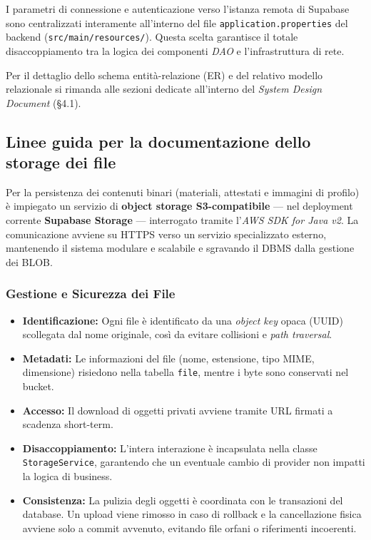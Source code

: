 I parametri di connessione e autenticazione verso l'istanza remota di Supabase sono centralizzati interamente all'interno del file \texttt{application.properties} del backend (\texttt{src/main/resources/}). Questa scelta garantisce il totale disaccoppiamento tra la logica dei componenti \textit{DAO} e l'infrastruttura di rete.

Per il dettaglio dello schema entit\`a-relazione (ER) e del relativo modello relazionale si rimanda alle sezioni dedicate all'interno del \textit{System Design Document} (§4.1).

\subsection{Linee guida per la documentazione dello storage dei file}
Per la persistenza dei contenuti binari (materiali, attestati e immagini di profilo) è impiegato un servizio di \textbf{object storage S3-compatibile} — nel deployment corrente \textbf{Supabase Storage} — interrogato tramite l'\textit{AWS SDK for Java v2}. La comunicazione avviene su HTTPS verso un servizio specializzato esterno, mantenendo il sistema modulare e scalabile e sgravando il DBMS dalla gestione dei BLOB.

\subsubsection{Gestione e Sicurezza dei File}
\begin{itemize}
    \item \textbf{Identificazione:} Ogni file è identificato da una \textit{object key} opaca (UUID) scollegata dal nome originale, così da evitare collisioni e \textit{path traversal}.
    \item \textbf{Metadati:} Le informazioni del file (nome, estensione, tipo MIME, dimensione) risiedono nella tabella \texttt{file}, mentre i byte sono conservati nel bucket.
    \item \textbf{Accesso:} Il download di oggetti privati avviene tramite URL firmati a scadenza short-term.
    \item \textbf{Disaccoppiamento:} L'intera interazione è incapsulata nella classe \texttt{StorageService}, garantendo che un eventuale cambio di provider non impatti la logica di business.
    \item \textbf{Consistenza:} La pulizia degli oggetti è coordinata con le transazioni del database. Un upload viene rimosso in caso di rollback e la cancellazione fisica avviene solo a commit avvenuto, evitando file orfani o riferimenti incoerenti.
\end{itemize}



